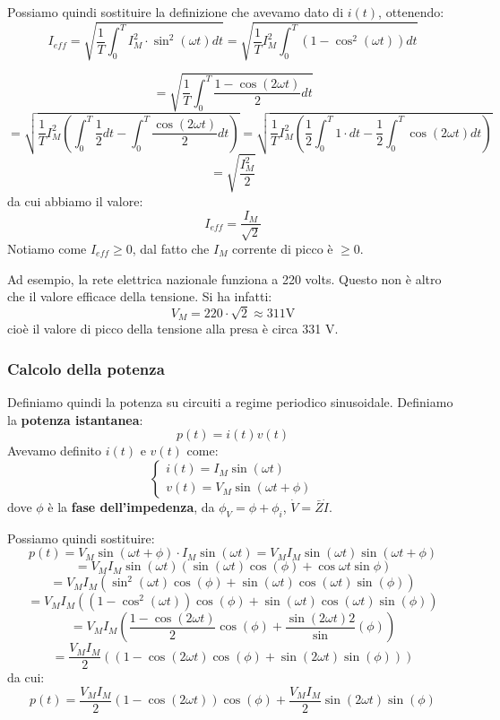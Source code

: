 \documentclass[a4paper,11pt]{article}
\begin{document}
Possiamo quindi sostituire la definizione che avevamo dato di $i(t)$, ottenendo:
$$
I_{eff} = \sqrt{\frac{1}{T} \int_0^T I_M^2 \cdot \sin^2(\omega t) dt} = \sqrt{\frac{1}{T}I_M^2 \int_0^T \left( 1 - \cos^2(\omega t) \right) dt}
$$

$$= \sqrt{\frac{1}{T} \int_0^T \frac{1-\cos(2\omega t)}{2} dt}
$$
$$
= \sqrt{\frac{1}{T} I_M^2 \left( \int_0^T \frac{1}{2}dt - \int_0^T \frac{\cos(2 \omega t)}{2}dt \right)}
= \sqrt{\frac{1}{T} I_M^2 \left( \frac{1}{2}\int_0^T 1\cdot dt - \frac{1}{2} \int_0^T \cos(2 \omega t)dt \right)}
$$
$$
=\sqrt{\frac{I_M^2}{2}} 
$$
da cui abbiamo il valore:
$$
I_{eff} = \frac{I_M}{\sqrt{2}}
$$
Notiamo come $I_{eff} \geq 0$, dal fatto che $I_M$ corrente di picco è $\geq 0$.

Ad esempio, la rete elettrica nazionale funziona a 220 volts. 
Questo non è altro che il valore efficace della tensione. Si ha infatti:
$$
V_{M} = 220 \cdot \sqrt{2} \approx 311 \mathrm{V}
$$
cioè il valore di picco della tensione alla presa è circa 331 V.

\subsubsection{Calcolo della potenza}
Definiamo quindi la potenza su circuiti a regime periodico sinusoidale.
Definiamo la \textbf{potenza istantanea}:
$$
p(t) = i(t)v(t)
$$
Avevamo definito $i(t)$ e $v(t)$ come:
\[
	\begin{cases}
		i(t) = I_M \sin(\omega t) \\ 
		v(t) = V_M \sin(\omega t + \phi)
	\end{cases}
\]
dove $\phi$ è la \textbf{fase dell'impedenza}, da $\phi_V = \phi + \phi_i$, $\dot{V} = \bar{Z} \dot{I}$.

Possiamo quindi sostituire:
$$
p(t) = V_M \sin(\omega t + \phi) \cdot I_M \sin(\omega t) = V_M I_M \sin(\omega t) \sin(\omega t + \phi) 
$$
$$
= V_M I_M \sin(\omega t)\left( \sin(\omega t) \cos(\phi) + \cos{\omega t} \sin{\phi} \right)
$$
$$
= V_M I_M \left( \sin^2 (\omega t) \cos (\phi) + \sin(\omega t) \cos(\omega t) \sin(\phi) \right)
$$
$$
= V_M I_M \left( \left( 1 - \cos^2(\omega t) \right) \cos(\phi) + \sin(\omega t)\cos(\omega t)\sin(\phi) \right)
$$
$$
= V_M I_M \left( \frac{1 - \cos(2 \omega t)}{2}\cos(\phi) + \frac{\sin(2 \omega t){2}}\sin(\phi) \right)
$$
$$
= \frac{V_M I_M}{2} \left( \left( 1 - \cos(2 \omega t) \cos (\phi) + \sin(2\omega t) \sin(\phi) \right) \right)
$$
da cui:
$$
p(t) = \frac{V_M I_M}{2}\left( 1 - \cos(2\omega t) \right) \cos(\phi) + \frac{V_M I_M}{2} \sin(2\omega t)\sin(\phi)
$$
\end{document}

